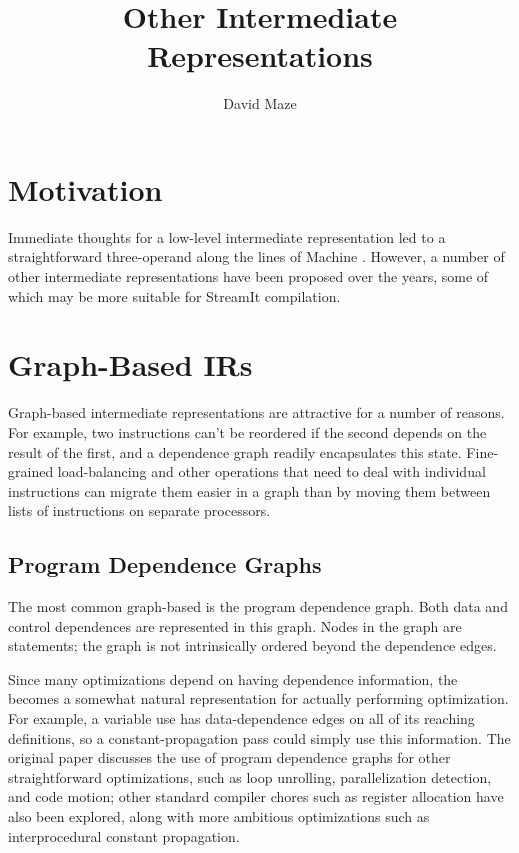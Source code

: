 \documentclass[11pt]{article}
\title{Other Intermediate Representations}
\author{David Maze\\\dmazemail}
\begin{document}
\maketitle
\tableofcontents

\section{Motivation}

Immediate thoughts for a low-level intermediate representation led to
a straightforward three-operand \ir along the lines of Machine \suif.
However, a number of other intermediate representations have been
proposed over the years, some of which may be more suitable for
StreamIt compilation.

\section{Graph-Based IRs}

Graph-based intermediate representations are attractive for a number
of reasons.  For example, two instructions can't be reordered if the
second depends on the result of the first, and a dependence graph
readily encapsulates this state.  Fine-grained load-balancing and
other operations that need to deal with individual instructions can
migrate them easier in a graph \ir than by moving them between lists
of instructions on separate processors.

\subsection{Program Dependence Graphs}

The most common graph-based \ir is the program dependence
graph\cite{pdg}.  Both data and control dependences are represented in
this graph.  Nodes in the graph are statements; the graph is not
intrinsically ordered beyond the dependence edges.

Since many optimizations depend on having dependence information, the
\pdg becomes a somewhat natural representation for actually performing
optimization.  For example, a variable use has data-dependence edges
on all of its reaching definitions, so a constant-propagation pass
could simply use this information.  The original \pdg paper discusses
the use of program dependence graphs for other straightforward
optimizations, such as loop unrolling, parallelization detection, and
code motion\cite{pdg}; other standard compiler chores such as register
allocation\cite{pdg-regalloc} have also been explored, along with more
ambitious optimizations such as interprocedural constant
propagation\cite{pdg-constprop}.
\end{document}
